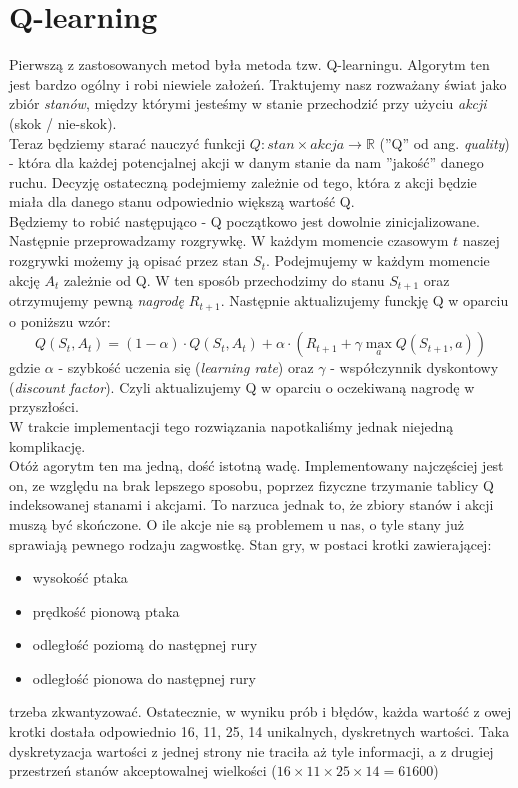 \documentclass[12pt, A4]{article}
\begin{document}
\section{Q-learning}
Pierwszą z zastosowanych metod była metoda tzw. Q-learningu. Algorytm ten jest bardzo ogólny i robi niewiele założeń. Traktujemy nasz rozważany świat jako zbiór \textit{stanów}, między którymi jesteśmy w stanie przechodzić przy użyciu \textit{akcji} (skok / nie-skok).  \\
	Teraz będziemy starać nauczyć funkcji $Q: stan \times akcja \rightarrow \mathbb{R}$ (''Q'' od ang. \textit{quality}) - która dla każdej potencjalnej akcji w danym stanie da nam ''jakość'' danego ruchu. Decyzję ostateczną podejmiemy zależnie od tego, która z akcji będzie miała dla danego stanu odpowiednio większą wartość Q. \\	
	Będziemy to robić następująco - Q początkowo jest dowolnie zinicjalizowane. Następnie przeprowadzamy rozgrywkę. W każdym momencie czasowym $t$ naszej rozgrywki możemy ją opisać przez stan $S_t$. Podejmujemy w każdym momencie akcję $A_t$ zależnie od Q. W ten sposób przechodzimy do stanu $S_{t+1}$ oraz otrzymujemy pewną \textit{nagrodę} $R_{t+1}$. Następnie aktualizujemy funckję Q w oparciu o poniższu wzór:
	\[	Q(S_t, A_t) = (1-\alpha)\cdot Q(S_t, A_t) + \alpha \cdot \left( R_{t+1} + \gamma \max_a Q(S_{t+1}, a) \right)	\]
	gdzie $\alpha$ - szybkość uczenia się (\textit{learning rate}) oraz $\gamma$ - współczynnik dyskontowy (\textit{discount factor}).
	Czyli aktualizujemy Q w oparciu o oczekiwaną nagrodę w przyszłości. \\
	W trakcie implementacji tego rozwiązania napotkaliśmy jednak niejedną komplikację. \\

	Otóż agorytm ten ma jedną, dość istotną wadę. Implementowany najczęściej jest on, ze względu na brak lepszego sposobu, poprzez fizyczne trzymanie tablicy Q indeksowanej stanami i akcjami. To narzuca jednak to, że zbiory stanów i akcji muszą być skończone. O ile akcje nie są problemem u nas, o tyle stany już sprawiają pewnego rodzaju zagwostkę. Stan gry, w postaci krotki zawierającej:
	\begin{itemize} 
	\item wysokość ptaka
	\item prędkość pionową ptaka
	\item	odległość poziomą do następnej rury
	\item odległość pionowa do następnej rury
	\end{itemize}
	trzeba zkwantyzować. Ostatecznie, w wyniku prób i błędów, każda wartość z owej krotki dostała odpowiednio 16, 11, 25, 14 unikalnych, dyskretnych wartości. Taka dyskretyzacja wartości z jednej strony nie traciła aż tyle informacji, a z drugiej przestrzeń stanów akceptowalnej wielkości ($16\times11\times25\times14 = 61600$)\\
\end{document}

